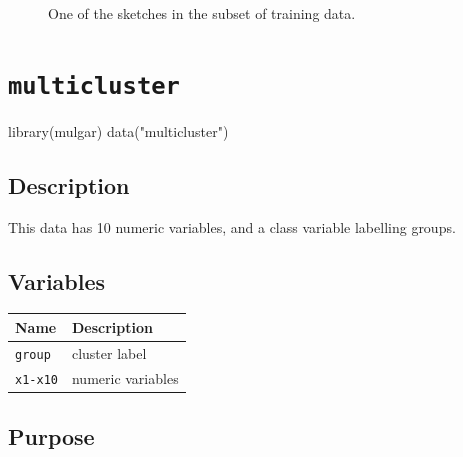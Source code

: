 \documentclass[
  letterpaper,
]{krantz}
\newenvironment{Shaded}{\begin{snugshade}}{\end{snugshade}}
\newcommand{\FunctionTok}[1]{\textcolor[rgb]{0.28,0.35,0.67}{#1}}
\newcommand{\NormalTok}[1]{\textcolor[rgb]{0.00,0.23,0.31}{#1}}
\newcommand{\StringTok}[1]{\textcolor[rgb]{0.13,0.47,0.30}{#1}}
\begin{document}
\begin{figure}[H]


\caption{\label{fig-sketches}One of the sketches in the subset of
training data.}

\end{figure}%

\section{\texorpdfstring{\texttt{multicluster}}{multicluster}}\label{multicluster}

\begin{Shaded}
\begin{Highlighting}[]
\FunctionTok{library}\NormalTok{(mulgar)}
\FunctionTok{data}\NormalTok{(}\StringTok{"multicluster"}\NormalTok{)}
\end{Highlighting}
\end{Shaded}

\subsection*{Description}\label{description-6}

This data has 10 numeric variables, and a class variable labelling
groups.

\subsection*{Variables}\label{variables-6}

\begin{longtable}[]{@{}ll@{}}
\toprule\noalign{}
Name & Description \\
\midrule\noalign{}
\endhead
\bottomrule\noalign{}
\endlastfoot
\texttt{group} & cluster label \\
\texttt{x1-x10} & numeric variables \\
\end{longtable}

\subsection*{Purpose}\label{purpose-6}
\end{document}
